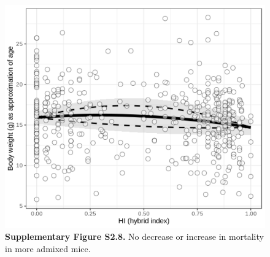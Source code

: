 \newpage

\begin{figure}[H]
	\centering
	\includegraphics[width=\linewidth,height=\textheight,keepaspectratio]{images/2article1/SupplementaryFigureS8.pdf}
	\captionsetup{labelformat=empty}
	\caption{\textbf{Supplementary Figure S2.8.}  No decrease or increase in mortality in more admixed mice.}
\end{figure}

\newpage

